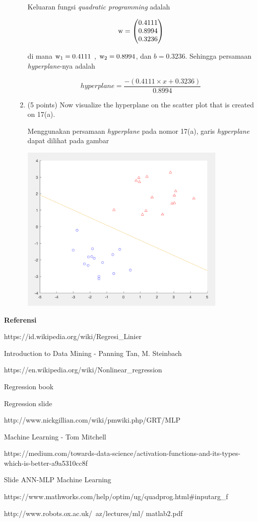 \documentclass[12pt]{article}%
\begin{document}
\begin{enumerate}
\begin{enumerate}
		\par Keluaran fungsi \textit{quadratic programming} adalah

			\[\textup{w} = \begin{pmatrix} 0.4111\\ 0.8994\\ 0.3236 \end{pmatrix}\]

		\par di mana $\textup{w}_1 = 0.4111$ , $\textup{w}_2 = 0.8994$, dan $b = 0.3236 $. Sehingga persamaan \textit{hyperplane}-nya adalah 

			\[hyperplane = \frac{-(0.4111\times x+0.3236)}{0.8994}\]

		\item (5 points) Now visualize the hyperplane on the scatter plot that is created on 17(a).
		\par Menggunakan persamaan \textit{hyperplane} pada nomor 17(a), garis \textit{hyperplane} dapat dilihat pada gambar

		\par \includegraphics[width=10cm]{ass2clo3no17_3} 
	\end{enumerate}
	


\end{enumerate}

\par \textbf{Referensi}
\par [1] https://id.wikipedia.org/wiki/Regresi\_Linier
\par [2] Introduction to Data Mining - Panning Tan, M. Steinbach
\par [3] https://en.wikipedia.org/wiki/Nonlinear\_regression
\par [4] Regression book
\par [5] Regression slide
\par [6] http://www.nickgillian.com/wiki/pmwiki.php/GRT/MLP
\par [7] Machine Learning - Tom Mitchell
\par [8] https://medium.com/towards-data-science/activation-functions-and-its-types-which-is-better-a9a5310cc8f
\par [9] Slide ANN-MLP Machine Learning
\par [10] https://www.mathworks.com/help/optim/ug/quadprog.html#inputarg\_f
\par [11] http://www.robots.ox.ac.uk/~az/lectures/ml/ matlab2.pdf
\end{document}

